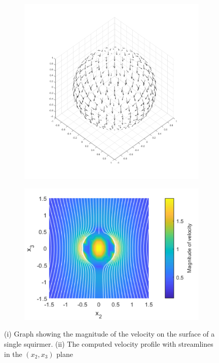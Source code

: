\begin{figure}
\begin{subfigure}[b]{0.475\textwidth}
    \centering
    \includegraphics[width=\textwidth]{Images/squirmers/Squiremer3D.pdf}
    \caption[]{\label{fig:Squiremer3D}}
\end{subfigure}
\hfill
\begin{subfigure}[b]{0.475\textwidth}
    \centering
    \includegraphics[width=\textwidth]{Images/squirmers/StreamLinesSingle.pdf}
    \caption[]{\label{fig:Squiremer3DFlow}}
\end{subfigure}
\caption[Velocity and Streamlines flows around a single squirmer.]{(i) Graph showing the magnitude of the velocity on the surface of a single squirmer. (ii) The computed velocity profile with streamlines in the $(x_2,x_3)$ plane}
\end{figure}


